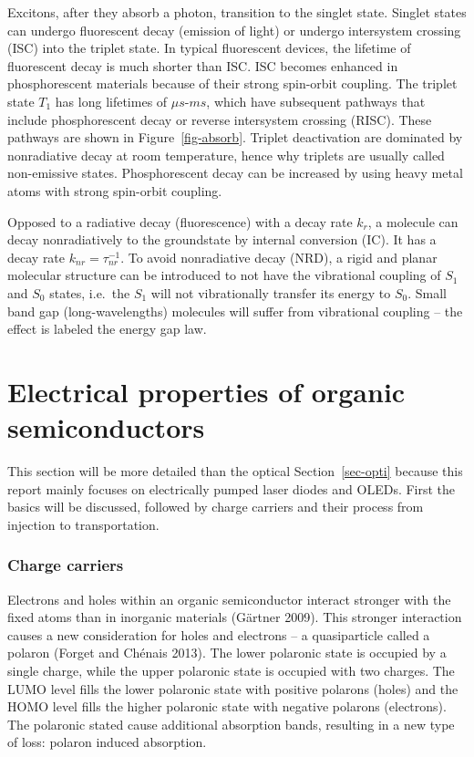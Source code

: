 \documentclass[
  letterpaper,
  DIV=11,
  numbers=noendperiod,
  oneside]{scrreprt}
\begin{document}
Excitons, after they absorb a photon, transition to the singlet state.
Singlet states can undergo fluorescent decay (emission of light) or
undergo intersystem crossing (ISC) into the triplet state. In typical
fluorescent devices, the lifetime of fluorescent decay is much shorter
than ISC. ISC becomes enhanced in phosphorescent materials because of
their strong spin-orbit coupling. The triplet state \(T_1\) has long
lifetimes of \(\mu s\)-\(ms\), which have subsequent pathways that
include phosphorescent decay or reverse intersystem crossing (RISC).
These pathways are shown in Figure~\ref{fig-absorb}. Triplet
deactivation are dominated by nonradiative decay at room temperature,
hence why triplets are usually called non-emissive states.
Phosphorescent decay can be increased by using heavy metal atoms with
strong spin-orbit coupling.

Opposed to a radiative decay (fluorescence) with a decay rate \(k_r\), a
molecule can decay nonradiatively to the groundstate by internal
conversion (IC). It has a decay rate \(k_{nr}=\tau_{nr}^{-1}\). To avoid
nonradiative decay (NRD), a rigid and planar molecular structure can be
introduced to not have the vibrational coupling of \(S_1\) and \(S_0\)
states, i.e.~the \(S_1\) will not vibrationally transfer its energy to
\(S_0\). Small band gap (long-wavelengths) molecules will suffer from
vibrational coupling -- the effect is labeled the energy gap law.

\hypertarget{electrical-properties-of-organic-semiconductors}{%
\section{Electrical properties of organic
semiconductors}\label{electrical-properties-of-organic-semiconductors}}

This section will be more detailed than the optical
Section~\ref{sec-opti} because this report mainly focuses on
electrically pumped laser diodes and OLEDs. First the basics will be
discussed, followed by charge carriers and their process from injection
to transportation.

\hypertarget{charge-carriers}{%
\subsubsection{Charge carriers}\label{charge-carriers}}

Electrons and holes within an organic semiconductor interact stronger
with the fixed atoms than in inorganic materials (Gärtner 2009). This
stronger interaction causes a new consideration for holes and electrons
-- a quasiparticle called a polaron (Forget and Chénais 2013). The lower
polaronic state is occupied by a single charge, while the upper
polaronic state is occupied with two charges. The LUMO level fills the
lower polaronic state with positive polarons (holes) and the HOMO level
fills the higher polaronic state with negative polarons (electrons). The
polaronic stated cause additional absorption bands, resulting in a new
type of loss: polaron induced absorption.
\end{document}
